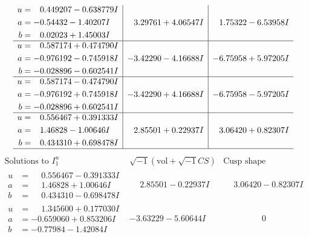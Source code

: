 \documentclass[1p]{elsarticle_modified}
\theoremstyle{definition}
\newcommand{\I}{\sqrt{-1}}
\begin{document}
$$\begin{array}{c|c|c}
\begin{aligned}
u &= \phantom{-}0.449207 - 0.638779 I \\
a &= -0.54432 - 1.40207 I \\
b &= \phantom{-}0.02023 + 1.45003 I\end{aligned}
 & \phantom{-}3.29761 + 4.06547 I & \phantom{-}1.75322 - 6.53958 I \\ \hline\begin{aligned}
u &= \phantom{-}0.587174 + 0.474790 I \\
a &= -0.976192 - 0.745918 I \\
b &= -0.028896 - 0.602541 I\end{aligned}
 & -3.42290 - 4.16688 I & -6.75958 + 5.97205 I \\ \hline\begin{aligned}
u &= \phantom{-}0.587174 - 0.474790 I \\
a &= -0.976192 + 0.745918 I \\
b &= -0.028896 + 0.602541 I\end{aligned}
 & -3.42290 + 4.16688 I & -6.75958 - 5.97205 I \\ \hline\begin{aligned}
u &= \phantom{-}0.556467 + 0.391333 I \\
a &= \phantom{-}1.46828 - 1.00646 I \\
b &= \phantom{-}0.434310 + 0.698478 I\end{aligned}
 & \phantom{-}2.85501 + 0.22937 I & \phantom{-}3.06420 + 0.82307 I\\
 \hline 
 \end{array}$$\newpage$$\begin{array}{c|c|c}  
\text{Solutions to }I^u_{1}& \I (\text{vol} + \sqrt{-1}CS) & \text{Cusp shape}\\
 \hline 
\begin{aligned}
u &= \phantom{-}0.556467 - 0.391333 I \\
a &= \phantom{-}1.46828 + 1.00646 I \\
b &= \phantom{-}0.434310 - 0.698478 I\end{aligned}
 & \phantom{-}2.85501 - 0.22937 I & \phantom{-}3.06420 - 0.82307 I \\ \hline\begin{aligned}
u &= \phantom{-}1.345600 + 0.177030 I \\
a &= -0.659060 + 0.853206 I \\
b &= -0.77984 - 1.42084 I\end{aligned}
 & -3.63229 - 5.60644 I & \phantom{-0.000000 } 0 \\ \hline\begin{aligned}

\end{aligned}
\end{array}$$
\end{document}
